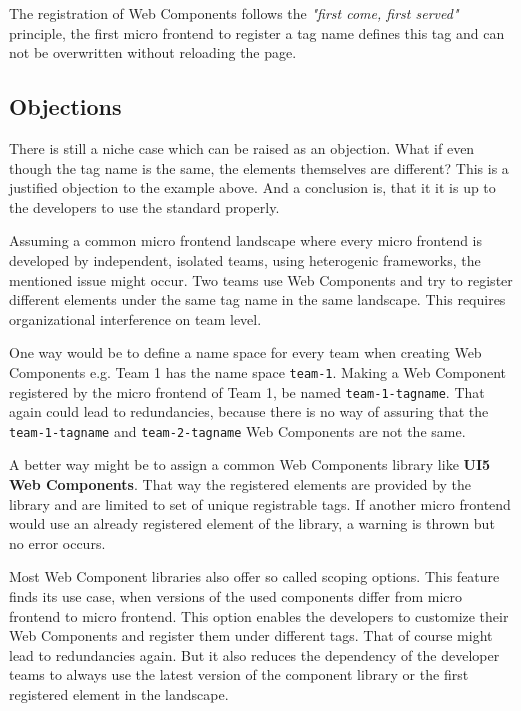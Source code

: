 The registration of Web Components follows the \textit{"first come, first served"} principle, the first micro frontend to register a tag name defines this tag and can not be overwritten without reloading the page.\cite{mdn_web_docs_define}

\subsection{Objections}

There is still a niche case which can be raised as an objection. What if even though the tag name is the same, the elements themselves are different? This is a justified objection to the example above. And a conclusion is, that it it is up to the developers to use the standard properly.

Assuming a common micro frontend landscape where every micro frontend is developed by independent, isolated teams, using heterogenic frameworks, the mentioned issue might occur. Two teams use Web Components and try to register different elements under the same tag name in the same landscape. This requires organizational interference on team level.

One way would be to define a name space for every team when creating Web Components e.g. Team 1 has the name space \texttt{team-1}. Making a Web Component registered by the micro frontend of Team 1, be named \texttt{team-1-tagname}. That again could lead to redundancies, because there is no way of assuring that the \texttt{team-1-tagname} and \texttt{team-2-tagname} Web Components are not the same.\cite{wc_best_practices}

A better way might be to assign a common Web Components library like \textbf{UI5 Web Components}. That way the registered elements are provided by the library and are limited to set of unique registrable tags. If another micro frontend would use an already registered element of the library, a warning is thrown but no error occurs.

Most Web Component libraries also offer so called scoping options. This feature finds its use case, when versions of the used components differ from micro frontend to micro frontend. This option enables the developers to customize their Web Components and register them under different tags. That of course might lead to redundancies again. But it also reduces the dependency of the developer teams to always use the latest version of the component library or the first registered element in the landscape. \cite{ui5_webcomponents_scoping} \cite{openwc_scoping}

